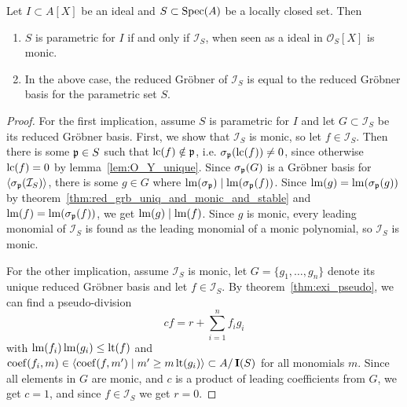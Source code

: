 \begin{theorem}\label{thm:para_iff_I_S_monic}
  Let $I \subset A[X]$ be an ideal and $S \subset \operatorname{Spec}(A)$ be a locally closed set. Then
  \begin{enumerate}
    \item $S$ is parametric for $I$ if and only if $\mathcal I_{S}$, when seen as a ideal in $\mathcal O_{S}[X]$ is monic.
    \item In the above case, the reduced Gröbner of $\mathcal I_{S}$ is equal to the reduced Gröbner basis for the parametric set $S$.
  \end{enumerate}
\end{theorem}
\begin{proof}
  For the first implication, assume $S$ is parametric for $I$ and let $G \subset \mathcal I_{S}$ be its reduced Gröbner basis. First, we show that $\mathcal I_{S}$ is monic, so let $f \in \mathcal I_{S}$. Then there is some $\mathfrak p \in S$ such that $\operatorname{lc}(f) \notin \mathfrak p$, i.e. $\sigma_{\mathfrak p}(\operatorname{lc}(f)) \neq 0$, since otherwise $\operatorname{lc}(f) = 0$ by lemma~\ref{lem:O_Y_unique}. Since $\sigma_{\mathfrak p}(G)$ is a Gröbner basis for $\langle \sigma_{\mathfrak p}(\mathcal I_{S}) \rangle$, there is some $g \in G$ where $\operatorname{lm}(\sigma_{\mathfrak p}) \mid \operatorname{lm}(\sigma_{\mathfrak p}(f))$. Since $\operatorname{lm}(g) = \operatorname{lm}(\sigma_{\mathfrak p}(g))$ by theorem~\ref{thm:red_grb_uniq_and_monic_and_stable} and $\operatorname{lm}(f) = \operatorname{lm}(\sigma_{\mathfrak p}(f))$, we get $\operatorname{lm}(g) \mid \operatorname{lm}(f)$. Since $g$ is monic, every leading monomial of $\mathcal I_{S}$ is found as the leading monomial of a monic polynomial, so $\mathcal I_{S}$ is monic.

  For the other implication, assume $\mathcal I_{S}$ is monic, let $G = \{g_{1}, \dots, g_{n}\}$ denote its unique reduced Gröbner basis and let $f \in \mathcal I_{S}$. By theorem~\ref{thm:exi_pseudo}, we can find a pseudo-division
  \[cf = r +  \sum_{i=1}^{n} f_{i} g_{i}\]
  with $\operatorname{lm}(f_{i})\operatorname{lm}(g_{i}) \leq \operatorname{lt}(f)$ and $\operatorname{coef}(f_{i}, m) \in \langle \operatorname{coef}(f, m') \mid m' \geq m \operatorname{lt}(g_{i}) \rangle \subset A/\operatorname{\mathbf I}(S)$ for all monomials $m$. Since all elements in $G$ are monic, and $c$ is a product of leading coefficients from $G$, we get $c = 1$, and since $f \in \mathcal I_{S}$ we get $r = 0$.


\end{proof}

